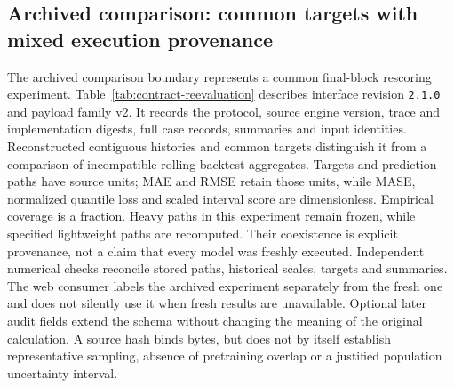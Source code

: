 \subsection{Archived comparison: common targets with mixed execution provenance}
\label{sec:contract-reevaluation}
The archived comparison boundary represents a common final-block rescoring experiment. Table~\ref{tab:contract-reevaluation} describes interface revision \texttt{2.1.0} and payload family v2. It records the protocol, source engine version, trace and implementation digests, full case records, summaries and input identities. Reconstructed contiguous histories and common targets distinguish it from a comparison of incompatible rolling-backtest aggregates. Targets and prediction paths have source units; MAE and RMSE retain those units, while MASE, normalized quantile loss and scaled interval score are dimensionless. Empirical coverage is a fraction. Heavy paths in this experiment remain frozen, while specified lightweight paths are recomputed. Their coexistence is explicit provenance, not a claim that every model was freshly executed. Independent numerical checks reconcile stored paths, historical scales, targets and summaries. The web consumer labels the archived experiment separately from the fresh one and does not silently use it when fresh results are unavailable. Optional later audit fields extend the schema without changing the meaning of the original calculation. A source hash binds bytes, but does not by itself establish representative sampling, absence of pretraining overlap or a justified population uncertainty interval.


